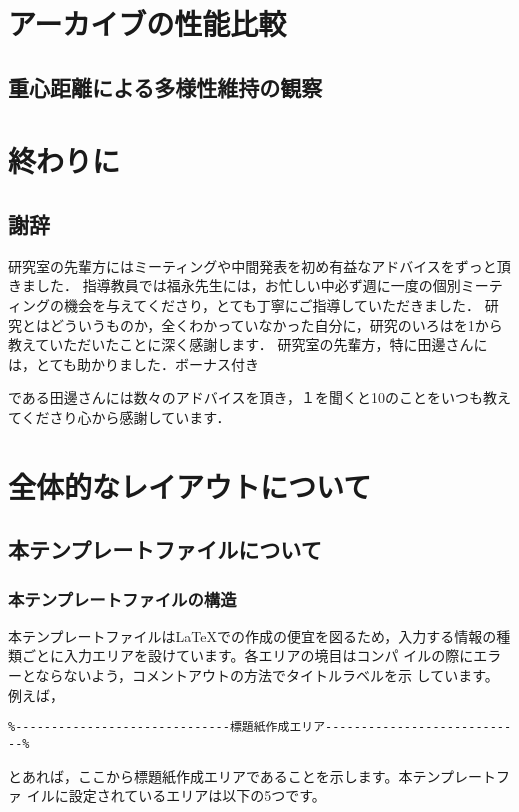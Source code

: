 \documentclass[a4paper,11pt,oneside,openany]{jsbook}
\begin{document}
\chapter{アーカイブの性能比較}
\section{重心距離による多様性維持の観察}
\section{}

\chapter{終わりに}
\section{謝辞}
研究室の先輩方にはミーティングや中間発表を初め有益なアドバイスをずっと頂きました．
指導教員では福永先生には，お忙しい中必ず週に一度の個別ミーティングの機会を与えてくださり，とても丁寧にご指導していただきました．
研究とはどういうものか，全くわかっていなかった自分に，研究のいろはを1から教えていただいたことに深く感謝します．
研究室の先輩方，特に田邊さんには，とても助かりました．ボーナス付き

である田邊さんには数々のアドバイスを頂き，１を聞くと10のことをいつも教えてくださり心から感謝しています．



\chapter{全体的なレイアウトについて}

\section{本テンプレートファイルについて}
\subsection{本テンプレートファイルの構造}
本テンプレートファイルは\LaTeX{}での作成の便宜を図るため，入力する情報の種
類ごとに入力エリアを設けています。各エリアの境目はコンパ
イルの際にエラーとならないよう，コメントアウトの方法でタイトルラベルを示
しています。
例えば，
\begin{verbatim}
%------------------------------標題紙作成エリア----------------------------%  
\end{verbatim}
とあれば，ここから標題紙作成エリアであることを示します。本テンプレートファ
イルに設定されているエリアは以下の5つです。
\end{document}
